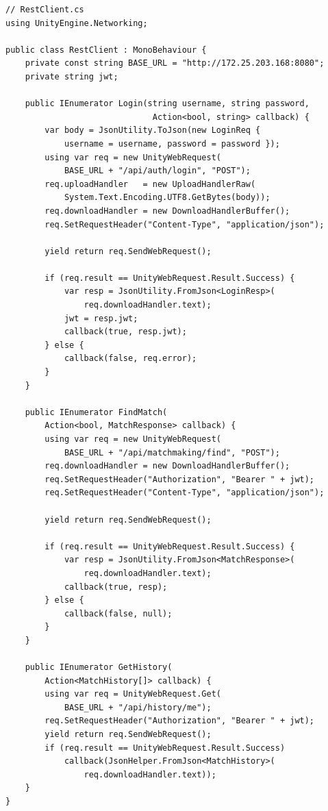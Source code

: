 \documentclass[12pt,a4paper]{report}
\begin{document}
\begin{lstlisting}[style=bashStyle, caption={RestClient --- gọi HTTP API bằng UnityWebRequest}, label={lst:restclient}]
// RestClient.cs
using UnityEngine.Networking;

public class RestClient : MonoBehaviour {
    private const string BASE_URL = "http://172.25.203.168:8080";
    private string jwt;

    public IEnumerator Login(string username, string password,
                              Action<bool, string> callback) {
        var body = JsonUtility.ToJson(new LoginReq {
            username = username, password = password });
        using var req = new UnityWebRequest(
            BASE_URL + "/api/auth/login", "POST");
        req.uploadHandler   = new UploadHandlerRaw(
            System.Text.Encoding.UTF8.GetBytes(body));
        req.downloadHandler = new DownloadHandlerBuffer();
        req.SetRequestHeader("Content-Type", "application/json");

        yield return req.SendWebRequest();

        if (req.result == UnityWebRequest.Result.Success) {
            var resp = JsonUtility.FromJson<LoginResp>(
                req.downloadHandler.text);
            jwt = resp.jwt;
            callback(true, resp.jwt);
        } else {
            callback(false, req.error);
        }
    }

    public IEnumerator FindMatch(
        Action<bool, MatchResponse> callback) {
        using var req = new UnityWebRequest(
            BASE_URL + "/api/matchmaking/find", "POST");
        req.downloadHandler = new DownloadHandlerBuffer();
        req.SetRequestHeader("Authorization", "Bearer " + jwt);
        req.SetRequestHeader("Content-Type", "application/json");

        yield return req.SendWebRequest();

        if (req.result == UnityWebRequest.Result.Success) {
            var resp = JsonUtility.FromJson<MatchResponse>(
                req.downloadHandler.text);
            callback(true, resp);
        } else {
            callback(false, null);
        }
    }

    public IEnumerator GetHistory(
        Action<MatchHistory[]> callback) {
        using var req = UnityWebRequest.Get(
            BASE_URL + "/api/history/me");
        req.SetRequestHeader("Authorization", "Bearer " + jwt);
        yield return req.SendWebRequest();
        if (req.result == UnityWebRequest.Result.Success)
            callback(JsonHelper.FromJson<MatchHistory>(
                req.downloadHandler.text));
    }
}
\end{lstlisting}
\end{document}
